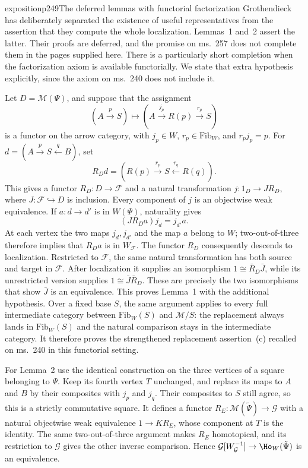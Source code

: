 \begin{dcomment}{exposition}{p249}{The deferred lemmas with functorial factorization}
Grothendieck has deliberately separated the existence of useful representatives from the assertion that they compute the whole localization. Lemmas~1 and~2 assert the latter. Their proofs are deferred, and the promise on ms.~257 does not complete them in the pages supplied here. There is a particularly short completion when the factorization axiom is available functorially. We state that extra hypothesis explicitly, since the axiom on ms.~240 does not include it.

Let $D=\mathcal M(\Psi)$, and suppose that the assignment
\[
 (A\xrightarrow p S)\longmapsto
 (A\xrightarrow{j_p}R(p)\xrightarrow{r_p}S)
\]
is a functor on the arrow category, with $j_p\in W$, $r_p\in\mathrm{Fib}_W$, and $r_pj_p=p$. For $d=(A\xrightarrow p S\xleftarrow q B)$, set
\[
 R_Dd=(R(p)\xrightarrow{r_p}S\xleftarrow{r_q}R(q)).
\]
This gives a functor $R_D:D\to\mathcal F$ and a natural transformation $j:1_D\to J R_D$, where $J:\mathcal F\hookrightarrow D$ is inclusion. Every component of $j$ is an objectwise weak equivalence. If $a:d\to d'$ is in $W(\Psi)$, naturality gives
\[
 (J R_Da)j_d=j_{d'}a.
\]
At each vertex the two maps $j_d,j_{d'}$ and the map $a$ belong to $W$; two-out-of-three therefore implies that $R_Da$ is in $W_{\mathcal F}$. The functor $R_D$ consequently descends to localization. Restricted to $\mathcal F$, the same natural transformation has both source and target in $\mathcal F$. After localization it supplies an isomorphism $1\cong \bar R_D\bar J$, while its unrestricted version supplies $1\cong\bar J\bar R_D$. These are precisely the two isomorphisms that show $\bar J$ is an equivalence. This proves Lemma~1 with the additional hypothesis. Over a fixed base $S$, the same argument applies to every full intermediate category between $\mathrm{Fib}_W(S)$ and $\mathcal M/S$: the replacement always lands in $\mathrm{Fib}_W(S)$ and the natural comparison stays in the intermediate category. It therefore proves the strengthened replacement assertion~(c) recalled on ms.~240 in this functorial setting.

For Lemma~2 use the identical construction on the three vertices of a square belonging to $\Psi$. Keep its fourth vertex $T$ unchanged, and replace its maps to $A$ and $B$ by their composites with $j_p$ and $j_q$. Their composites to $S$ still agree, so this is a strictly commutative square. It defines a functor $R_E:\mathcal M(\tilde\Psi)\to\mathcal G$ with a natural objectwise weak equivalence $1\to K R_E$, whose component at $T$ is the identity. The same two-out-of-three argument makes $R_E$ homotopical, and its restriction to $\mathcal G$ gives the other inverse comparison. Hence $\mathcal G[W_{\mathcal G}^{-1}]\to\Ho_W(\tilde\Psi)$ is an equivalence.


\end{dcomment}

